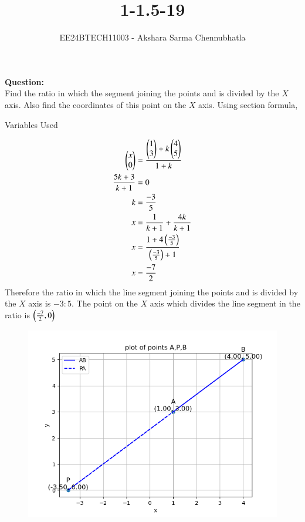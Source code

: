 \documentclass[journal]{IEEEtran}
\begin{document}

\vspace{3cm}

\title{1-1.5-19}
\author{EE24BTECH11003 - Akshara Sarma Chennubhatla}
{\let\newpage\relax\maketitle}

\renewcommand{\thefigure}{\theenumi}
\renewcommand{\thetable}{\theenumi}
\setlength{\intextsep}{10pt} %


\renewcommand{\thetable}{\theenumi}

\textbf{Question:} \\Find the ratio in which the segment joining the points  and  is divided by the $X$ axis. Also find the coordinates of this point on the $X$ axis.
Using section formula,\\
\begin{table}[h!]    
  \centering
  
  \caption{Variables Used}
  \label{tab1-1.5-19}
\end{table}
\solution
\begin{align}
\begin{pmatrix}x\\0\end{pmatrix}&=\frac{\begin{pmatrix}1\\3\end{pmatrix}+k\begin{pmatrix}4\\5\end{pmatrix}}{1+k}\\
\frac{5k+3}{k+1}&=0\\
k&=\frac{-3}{5}\\
x&=\frac{1}{k+1}+\frac{4k}{k+1}\\
x&=\frac{1+4\left(\frac{-3}{5}\right)}{\left(\frac{-3}{5}\right)+1}\\
x&=\frac{-7}{2}
\end{align}
Therefore the ratio in which the line segment joining the points  and  is divided by the $X$ axis is $-3:5$. The point on the $X$ axis which divides the line segment in the ratio is $\left(\frac{-7}{2},0\right)$
\begin{figure}[h!]
\centering
\includegraphics[width=0.7\columnwidth]{figs/figure.png}	
\label{Plot of points A,B and P and the line joining them}
\end{figure}
\end{document}
